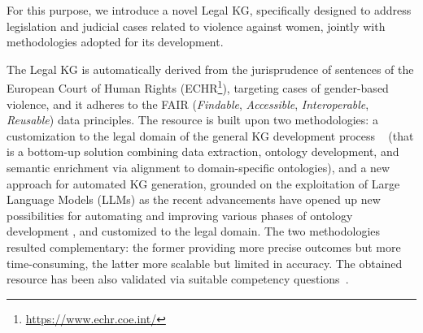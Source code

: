 \documentclass[runningheads]{llncs}
\begin{document}
%
%
For this purpose, %
we introduce a novel %
Legal KG, specifically designed to address legislation and judicial cases related to violence against women, jointly with methodologies adopted for its development. %



The %
Legal KG is automatically derived from the jurisprudence of sentences of the European Court of Human Rights (ECHR\footnote{\url{ https://www.echr.coe.int/}}), %
targeting cases of gender-based violence, and it %
adheres to the FAIR (\textit{Findable}, \textit{Accessible}, \textit{Interoperable}, \textit{Reusable}) data principles. %
%
The resource is built upon two %
methodologies: a customization to the legal domain of the general KG development process%
~\cite{Tamaauskaite2022} (that is a bottom-up solution %
combining data extraction, ontology development, and semantic enrichment via %
alignment to domain-specific ontologies), %
and a new approach for automated KG generation, grounded on the exploitation of Large Language Models (LLMs) as the recent advancements have opened up new possibilities for automating and improving various phases of ontology development \cite{li2025large}, and %
customized to the legal domain. %
The two methodologies resulted complementary: the former providing more precise outcomes but more time-consuming, the latter more scalable but limited in accuracy.
The obtained resource has been also validated via suitable competency questions~\cite{Monfardini2023}. %
\end{document}
